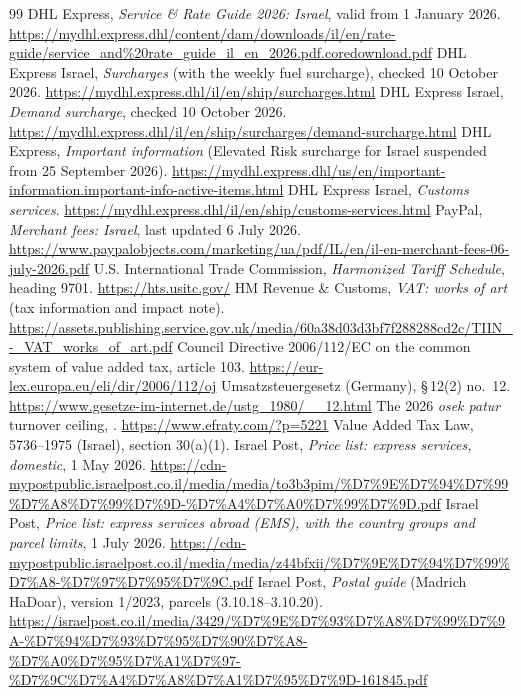 \documentclass[11pt,a4paper]{article}
\newcommand{\nis}[1]{\text{NIS\,#1}}
\begin{document}
{\raggedright
\begin{thebibliography}{99}
 DHL Express, \emph{Service \& Rate Guide 2026: Israel}, valid from 1 January
  2026.
  \url{https://mydhl.express.dhl/content/dam/downloads/il/en/rate-guide/service_and%20rate_guide_il_en_2026.pdf.coredownload.pdf}
 DHL Express Israel, \emph{Surcharges} (with the weekly fuel surcharge), checked
  10 October 2026. \url{https://mydhl.express.dhl/il/en/ship/surcharges.html}
 DHL Express Israel, \emph{Demand surcharge}, checked 10 October 2026.
  \url{https://mydhl.express.dhl/il/en/ship/surcharges/demand-surcharge.html}
 DHL Express, \emph{Important information} (Elevated Risk surcharge for Israel
  suspended from 25 September 2026).
  \url{https://mydhl.express.dhl/us/en/important-information.important-info-active-items.html}
 DHL Express Israel, \emph{Customs services}.
  \url{https://mydhl.express.dhl/il/en/ship/customs-services.html}
 PayPal, \emph{Merchant fees: Israel}, last updated 6 July 2026.
  \url{https://www.paypalobjects.com/marketing/ua/pdf/IL/en/il-en-merchant-fees-06-july-2026.pdf}
 U.S. International Trade Commission, \emph{Harmonized Tariff Schedule}, heading
  9701. \url{https://hts.usitc.gov/}
 HM Revenue \& Customs, \emph{VAT: works of art} (tax information and impact note).
  \url{https://assets.publishing.service.gov.uk/media/60a38d03d3bf7f288288cd2c/TIIN_-_VAT_works_of_art.pdf}
 Council Directive 2006/112/EC on the common system of value added tax,
  article 103. \url{https://eur-lex.europa.eu/eli/dir/2006/112/oj}
 Umsatzsteuergesetz (Germany), \S\,12(2) no.~12.
  \url{https://www.gesetze-im-internet.de/ustg_1980/__12.html}
 The 2026 \emph{osek patur} turnover ceiling, \nis{122{,}833}.
  \url{https://www.efraty.com/?p=5221}
 Value Added Tax Law, 5736--1975 (Israel), section 30(a)(1).
 Israel Post, \emph{Price list: express services, domestic}, 1 May 2026.
  \url{https://cdn-mypostpublic.israelpost.co.il/media/media/to3b3pim/%D7%9E%D7%94%D7%99%D7%A8%D7%99%D7%9D-%D7%A4%D7%A0%D7%99%D7%9D.pdf}
 Israel Post, \emph{Price list: express services abroad (EMS), with the country
  groups and parcel limits}, 1 July 2026.
  \url{https://cdn-mypostpublic.israelpost.co.il/media/media/z44bfxii/%D7%9E%D7%94%D7%99%D7%A8-%D7%97%D7%95%D7%9C.pdf}
 Israel Post, \emph{Postal guide} (Madrich HaDoar), version 1/2023, parcels
  (3.10.18--3.10.20). \url{https://israelpost.co.il/media/3429/%D7%9E%D7%93%D7%A8%D7%99%D7%9A-%D7%94%D7%93%D7%95%D7%90%D7%A8-%D7%A0%D7%95%D7%A1%D7%97-%D7%9C%D7%A4%D7%A8%D7%A1%D7%95%D7%9D-161845.pdf}
\end{thebibliography}
}
\end{document}
